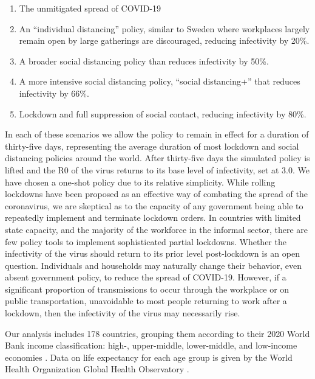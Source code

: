 \documentclass[11pt]{article}
\begin{document}
\begin{enumerate}
	\item The unmitigated spread of COVID-19
	\item An ``individual distancing'' policy, similar to Sweden where workplaces largely remain open by large gatherings are discouraged, reducing infectivity by 20\%.
	\item A broader social distancing policy than reduces infectivity by 50\%.
	\item A more intensive social distancing policy, ``social distancing+'' that reduces infectivity by 66\%.
	\item Lockdown and full suppression of social contact, reducing infectivity by 80\%.
\end{enumerate}

In each of these scenarios we allow the policy to remain in effect for a duration of thirty-five days, representing the average duration of most lockdown and social distancing policies around the world. After thirty-five days the simulated policy is lifted and the R0 of the virus returns to its base level of infectivity, set at 3.0. We have chosen a one-shot policy due to its relative simplicity. While rolling lockdowns have been proposed as an effective way of combating the spread of the coronavirus, we are skeptical as to the capacity of any government being able to repeatedly implement and terminate lockdown orders. In countries with limited state capacity, and the majority of the workforce in the informal sector, there are few policy tools to implement sophisticated partial lockdowns. Whether the infectivity of the virus should return to its prior level post-lockdown is an open question. Individuals and households may naturally change their behavior, even absent government policy, to reduce the spread of COVID-19. However, if a significant proportion of transmissions to occur through the workplace or on public transportation, unavoidable to most people returning to work after a lockdown, then the infectivity of the virus may necessarily rise.


Our analysis includes 178 countries, grouping them according to their 2020 World Bank income classification: high-, upper-middle, lower-middle, and low-income economies \parencite{wb-income}. Data on life expectancy for each age group is given by the World Health Organization Global Health Observatory \parencite{who}. %


\end{document}
